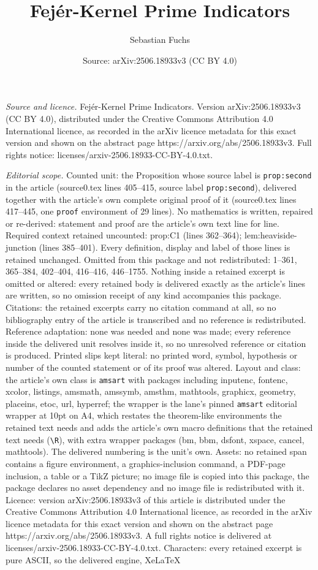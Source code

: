 \documentclass[10pt,a4paper]{amsart}
\title[Fej\'er-Kernel Prime Indicators]{Fej\'er-Kernel Prime Indicators}
\author{Sebastian Fuchs}
\date{Source: arXiv:2506.18933v3 (CC BY 4.0)}
\begin{document}
\maketitle

\noindent\emph{Source and licence.} Fej\'er-Kernel Prime Indicators. Version arXiv:2506.18933v3 (CC BY 4.0), distributed under the Creative Commons Attribution 4.0 International licence, as recorded in the arXiv licence metadata for this exact version and shown on the abstract page https://arxiv.org/abs/2506.18933v3. Full rights notice: licenses/arxiv-2506.18933-CC-BY-4.0.txt.\par\smallskip

\noindent\textit{Editorial scope.} Counted unit: the Proposition whose source label is \texttt{prop:second} in the article (source0.tex lines 405--415, source label \texttt{prop:second}), delivered together with the article's own complete original proof of it (source0.tex lines 417--445, one \texttt{proof} environment of 29 lines). No mathematics is written, repaired or re-derived: statement and proof are the article's own text line for line. Required context retained uncounted: prop:C1 (lines 362--364); lem:heaviside-junction (lines 385--401). Every definition, display and label of those lines is retained unchanged. Omitted from this package and not redistributed: 1--361, 365--384, 402--404, 416--416, 446--1755. Nothing inside a retained excerpt is omitted or altered: every retained body is delivered exactly as the article's lines are written, so no omission receipt of any kind accompanies this package. Citations: the retained excerpts carry no citation command at all, so no bibliography entry of the article is transcribed and no reference is redistributed. Reference adaptation: none was needed and none was made; every reference inside the delivered unit resolves inside it, so no unresolved reference or citation is produced. Printed slips kept literal: no printed word, symbol, hypothesis or number of the counted statement or of its proof was altered. Layout and class: the article's own class is \texttt{amsart} with packages including inputenc, fontenc, xcolor, listings, amsmath, amssymb, amsthm, mathtools, graphicx, geometry, placeins, etoc, url, hyperref; the wrapper is the lane's pinned \texttt{amsart} editorial wrapper at 10pt on A4, which restates the theorem-like environments the retained text needs and adds the article's own macro definitions that the retained text needs (\texttt{\textbackslash R}), with extra wrapper packages (bm, bbm, dsfont, xspace, cancel, mathtools). The delivered numbering is the unit's own. Assets: no retained span contains a figure environment, a graphics-inclusion command, a PDF-page inclusion, a table or a TikZ picture; no image file is copied into this package, the package declares no asset dependency and no image file is redistributed with it. Licence: version arXiv:2506.18933v3 of this article is distributed under the Creative Commons Attribution 4.0 International licence, as recorded in the arXiv licence metadata for this exact version and shown on the abstract page https://arxiv.org/abs/2506.18933v3. A full rights notice is delivered at licenses/arxiv-2506.18933-CC-BY-4.0.txt. Characters: every retained excerpt is pure ASCII, so the delivered engine, XeLaTeX 
\end{document}
